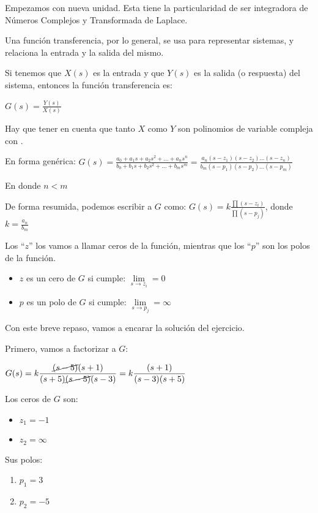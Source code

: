 \documentclass[11pt]{article}
\begin{document}
	Empezamos con nueva unidad. Esta tiene la particularidad de ser integradora de Números Complejos y Transformada de Laplace.
	
	Una función transferencia, por lo general, se usa para representar sistemas, y relaciona la entrada y la salida del mismo.
	
	Si tenemos que $X(s)$ es la entrada y que $Y(s)$ es la salida (o respuesta) del sistema, entonces la función transferencia es:
	
	$\displaystyle G(s)=\frac{Y(s)}{X(s)}$
	
	Hay que tener en cuenta que tanto $X$ como $Y$ son polinomios de variable compleja con .
	
	En forma genérica: $\displaystyle G(s)=\frac{a_0+a_1s+a_2s^2+\dots+a_ns^n}{b_0+b_1s+b_2s^2+\dots+b_ms^m}=\frac{a_n(s-z_1)(s-z_2)\dots(s-z_n)}{b_m(s-p_1)(s-p_2)\dots(s-p_m)}$
	
	En donde $n<m$
	
	De forma resumida, podemos escribir a $G$ como: $\displaystyle G(s)=k\frac{\prod (s-z_i)}{\prod(s-p_j)}$, donde $k=\frac{a_n}{b_m}$
	
	Los ``$z$'' los vamos a llamar ceros de la función, mientras que los ``$p$'' son los polos de la función.
	
	\begin{itemize}
		\item $z$ es un cero de $G$ si cumple: $\displaystyle \lim\limits_{s\rightarrow z_i}=0$
		\item $p$ es un polo de $G$ si cumple: $\displaystyle \lim\limits_{s\rightarrow p_j}=\infty$
	\end{itemize}

	Con este breve repaso, vamos a encarar la solución del ejercicio.
	
	Primero, vamos a factorizar a $G$:
	
	$\displaystyle G(s)=k\frac{\cancel{(s-5)}(s+1)}{(s+5)\cancel{(s-5)}(s-3)}=k\frac{(s+1)}{(s-3)(s+5)}$
	
	Los ceros de $G$ son:
	\begin{itemize}
		\item $z_1=-1$
		\item $z_2=\infty$
	\end{itemize}

	Sus polos:
	\begin{enumerate}[label=(\alph*)]
		\item $p_1=3$
		\item $p_2=-5$
	\end{enumerate}
\end{document}
